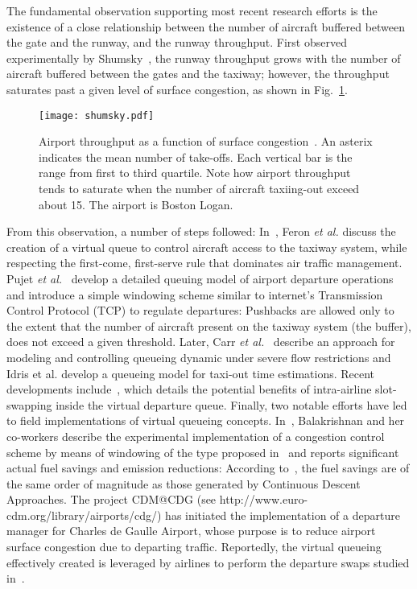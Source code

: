 \documentclass[letterpaper]{article}
\begin{document}
The fundamental observation supporting most recent research efforts is the existence of a close relationship between the number of aircraft buffered between the gate and the runway, and the runway throughput. First observed experimentally by Shumsky~\cite{Shu:95}, the runway throughput grows with the number of aircraft buffered between the gates and the taxiway; however, the throughput saturates past a given level of surface congestion, as shown in Fig.~\ref{shumskypix}.
\begin{figure}[ht]
\centering
\texttt{[image: shumsky.pdf]}
\caption{Airport throughput as a function of surface congestion~\cite[p. 82]{Shu:95}. An asterix indicates the mean number of take-offs. Each vertical bar is the range from first to third quartile. Note how airport throughput tends to saturate when the number of aircraft taxiing-out exceed about 15. The airport is Boston Logan.}
\label{shumskypix}
\end{figure}
From this observation, a number of steps followed: In~\cite{Feron1997}, Feron {\em et al.} discuss the creation of a virtual queue to control aircraft access to the taxiway system, while respecting the first-come, first-serve rule that dominates air traffic management. Pujet {\em et al.}~\cite{log99} develop a detailed queuing model of airport departure operations and introduce a simple windowing scheme similar to internet's Transmission Control Protocol (TCP) to regulate departures: Pushbacks are allowed only to the extent that the number of aircraft present on the taxiway system (the buffer), does not exceed a given threshold.
Later, Carr {\em et al.}~\cite{Carr2002} describe an approach for modeling and controlling queueing dynamic under severe flow restrictions and Idris et al. \cite{Idris2002} develop a queueing model for taxi-out time estimations. Recent developments include~\cite{Burgain2009}, which details the potential benefits of intra-airline slot-swapping inside the virtual departure queue. Finally, two notable efforts have led to field implementations of virtual queueing concepts. In~\cite{SKB:11}, Balakrishnan and her co-workers describe the experimental implementation of a congestion control scheme by means of windowing of the type proposed in~\cite{log99} and reports significant actual fuel savings and emission reductions: According to~\cite{SKB:11}, the fuel savings are of the same order of magnitude as those generated by Continuous Descent Approaches. The project CDM@CDG (see http://www.euro-cdm.org/library/airports/cdg/) has initiated the implementation of a departure manager for Charles de Gaulle Airport, whose purpose is to reduce airport surface congestion due to departing traffic. Reportedly, the virtual queueing effectively created is leveraged by airlines to perform the departure swaps studied in~\cite{Burgain2009}.
\end{document}
